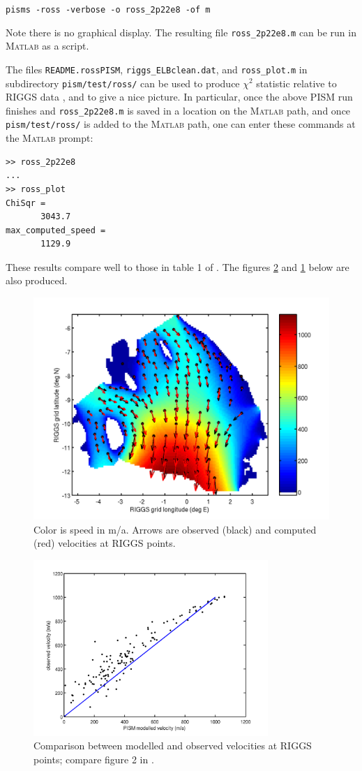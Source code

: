 \documentclass[12pt,final]{amsart}
\newcommand{\Matlab}{\textsc{Matlab}\xspace}
\begin{document}
\verb|pisms -ross -verbose -o ross_2p22e8 -of m|

\noindent Note there is no graphical display.  The resulting file \verb|ross_2p22e8.m| can be run in \Matlab as a script.

The files \verb|README.rossPISM|, \verb|riggs_ELBclean.dat|, and \verb|ross_plot.m| in subdirectory \verb|pism/test/ross/| can be used to produce $\chi^2$ statistic relative to RIGGS data \cite{MacAyealetal}, and to give a nice picture.  In particular, once the above PISM run finishes and \verb|ross_2p22e8.m| is saved in a location on the \Matlab path, and once \verb|pism/test/ross/| is added to the \Matlab path, one can enter these commands at the \Matlab prompt:
\small\begin{verbatim}
>> ross_2p22e8
...
>> ross_plot
ChiSqr =
       3043.7
max_computed_speed =
       1129.9
\end{verbatim}
\normalsize
These results compare well to those in table 1 of \cite{MacAyealetal}.  The figures \ref{fig:rossscatter} and \ref{fig:rossvelocities} below are also produced.

\begin{figure}[ht]
\includegraphics[width=4.5in,keepaspectratio=true]{figs/rossvelocities}
\caption{Color is speed in m/a.  Arrows are observed (black) and computed (red) velocities at RIGGS points.}
\label{fig:rossvelocities}
\end{figure}

\begin{figure}[ht]
\includegraphics[width=3.5in,keepaspectratio=true]{figs/rossscatter}
\caption{Comparison between modelled and observed velocities at RIGGS points; compare figure 2  in \cite{MacAyealetal}.}
\label{fig:rossscatter}
\end{figure}
\end{document}
